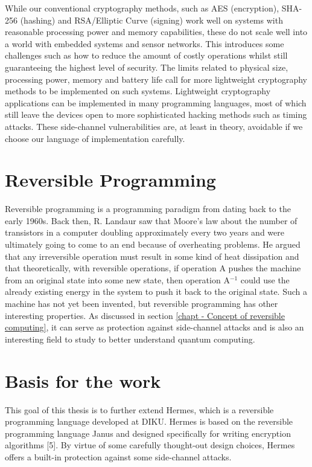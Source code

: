 
While our conventional cryptography methods, such as AES (encryption), SHA-256 (hashing) and RSA/Elliptic Curve (signing) work well on systems with reasonable processing power and memory capabilities, these do not scale well into a world with embedded systems and sensor networks.
This introduces some challenges such as how to reduce the amount of costly operations whilst still guaranteeing the highest level of security. The limits related to physical size, processing power, memory and battery life call for more lightweight cryptography methods to be implemented on such systems.
Lightweight cryptography applications can be implemented in many programming languages, most of which still leave the devices open to more sophisticated hacking methods such as timing attacks. These side-channel vulnerabilities are, at least in theory, avoidable if we choose our language of implementation carefully.

\section{Reversible Programming}

Reversible programming is a programming paradigm from dating back to the early 1960s. Back then, R. Landaur saw that Moore's law about the number of transistors in a computer doubling approximately every two years and   were ultimately going to come to an end because of overheating problems.
He argued that any irreversible operation must result in some kind of heat dissipation and that theoretically, with reversible operations, if operation A pushes the machine from an original state into some new state, then operation A$^{-1}$ could use the already existing energy in the system to push it back to the original state.
Such a machine has not yet been invented, but reversible programming has other interesting properties.
As discussed in section \ref{chapt - Concept of reversible computing}, it can serve as protection against side-channel attacks and is also an interesting field to study to better understand quantum computing.

\section{Basis for the work}
This goal of this thesis is to further extend Hermes, which is a reversible programming language developed at DIKU.
Hermes is based on the reversible programming language Janus and designed specifically for writing encryption algorithms [5].
By virtue of some carefully thought-out design choices, Hermes offers a built-in protection against some side-channel attacks.

